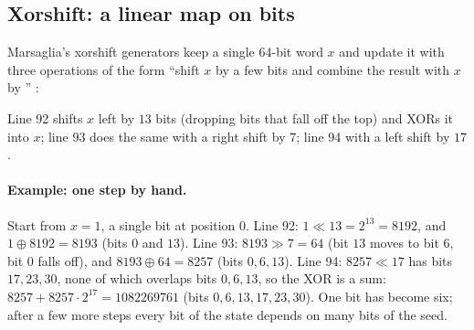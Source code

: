 \subsection{Xorshift: a linear map on bits}

Marsaglia's xorshift generators \cite{Marsaglia2003} keep a single $64$-bit word
$x$ and update it with three operations of the form ``shift $x$ by a few bits and
combine the result with $x$ by '' :


Line 92 shifts $x$ left by $13$ bits (dropping bits that fall off the top) and XORs
it into $x$; line 93 does the same with a right shift by $7$; line 94 with a left
shift by $17$.

\paragraph{Example: one step by hand.}
Start from $x=1$, a single bit at position $0$. Line 92: $1\ll13=2^{13}=8192$, and
$1\oplus8192=8193$ (bits $0$ and $13$). Line 93: $8193\gg7=64$ (bit $13$ moves to
bit $6$, bit $0$ falls off), and $8193\oplus64=8257$ (bits $0,6,13$). Line 94:
$8257\ll17$ has bits $17,23,30$, none of which overlaps bits $0,6,13$, so the XOR is
a sum: $8257+8257\cdot2^{17}=1082269761$ (bits $0,6,13,17,23,30$). One bit has
become six; after a few more steps every bit of the state depends on many bits of
the seed.

